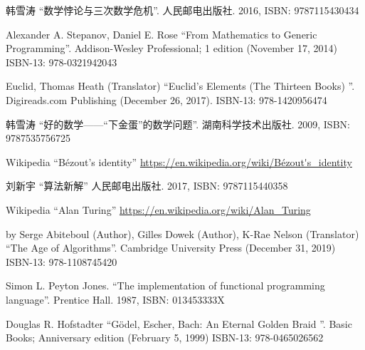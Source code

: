 \documentclass{article}
\begin{document}
\ifx\wholebook\relax \else
\begin{thebibliography}{99}

{\fontspec{\cnmainft}韩雪涛 ``数学悖论与三次数学危机''. 人民邮电出版社. 2016, ISBN: 9787115430434}

Alexander A. Stepanov, Daniel E. Rose ``From Mathematics to Generic Programming''. Addison-Wesley Professional; 1 edition (November 17, 2014) ISBN-13: 978-0321942043

Euclid, Thomas Heath (Translator) ``Euclid's Elements (The Thirteen Books) ''. Digireads.com Publishing (December 26, 2017). ISBN-13: 978-1420956474

{\fontspec{\cnmainft}韩雪涛 ``好的数学——“下金蛋”的数学问题''. 湖南科学技术出版社. 2009, ISBN: 9787535756725}

Wikipedia ``Bézout's identity'' \url{https://en.wikipedia.org/wiki/Bézout's_identity}

{\fontspec{\cnmainft}刘新宇 ``算法新解'' 人民邮电出版社. 2017, ISBN: 9787115440358}

Wikipedia ``Alan Turing'' \url{https://en.wikipedia.org/wiki/Alan_Turing}

by Serge Abiteboul (Author), Gilles Dowek (Author), K-Rae Nelson (Translator) ``The Age of Algorithms''. Cambridge University Press (December 31, 2019) ISBN-13: 978-1108745420

Simon L. Peyton Jones. ``The implementation of functional programming language''. Prentice Hall. 1987, ISBN: 013453333X

Douglas R. Hofstadter ``Gödel, Escher, Bach: An Eternal Golden Braid ''. Basic Books; Anniversary edition (February 5, 1999) ISBN-13: 978-0465026562

\end{thebibliography}

\expandafter\enddocument

\fi
\end{document}
